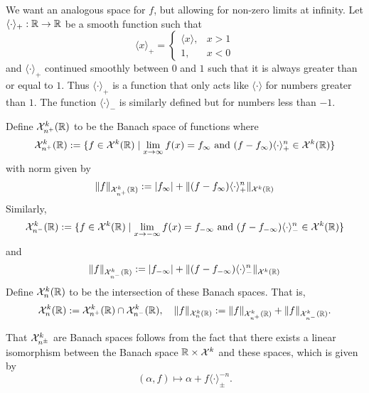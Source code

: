 We want an analogous space for \(f\), but allowing for non-zero limits at infinity. Let \(\langle\cdot \rangle_+ :\mathbb{R} \to \mathbb{R}\) be a smooth function such that
\begin{equation}
	\langle x \rangle_+ = \begin{cases} \langle x \rangle, & x>1 \\ 1, & x<0\end{cases}
\end{equation}
and \(\langle \cdot \rangle_+\) continued smoothly between \(0\) and \(1\) such that it is always greater than or equal to \(1\). Thus \(\langle \cdot \rangle_+\) is a function that only acts like \(\langle \cdot \rangle\) for numbers greater than \(1\). The function \(\langle \cdot \rangle_-\) is similarly defined but for numbers less than \(-1\).

\begin{defn}
	Define \(\mathcal{X}^k_{n^+} (\mathbb{R})\) to be the Banach space of functions where 
	\begin{equation}
		\mathcal{X}^k_{n^+} (\mathbb{R}) := \{ f \in \mathcal{X}^k(\mathbb{R}) \mid \lim_{x\to\infty} f(x) = f_\infty\text{ and } (f-f_\infty)\langle\cdot\rangle_+^n \in \mathcal{X}^k(\mathbb{R})\}
	\end{equation}
	with norm given by
	\begin{equation}
		\| f \|_{\mathcal{X}^k_{n^+}(\mathbb{R})} := |f_\infty| + \|(f-f_\infty) \langle \cdot \rangle_+^n \|_{\mathcal X^k(\mathbb{R})}
	\end{equation}
	Similarly, 
	\begin{equation}
		\mathcal{X}^k_{n^-} (\mathbb{R}) := \{ f \in \mathcal{X}^k(\mathbb{R}) \mid \lim_{x\to-\infty} f(x) = f_{-\infty}\text{ and } (f-f_{-\infty})\langle\cdot\rangle_-^n \in \mathcal{X}^k(\mathbb{R})\}
	\end{equation}
	and 
	\begin{equation}
		\| f \|_{\mathcal{X}^k_{n^-}(\mathbb{R})} := |f_{-\infty}| + \|(f-f_{-\infty}) \langle \cdot \rangle_-^n \|_{\mathcal X^k(\mathbb{R})}
	\end{equation}
	Define \(\mathcal{X}^k_n(\mathbb{R})\) to be the intersection of these Banach spaces. That is,
	\begin{equation}
		\mathcal{X}^k_n(\mathbb{R}) := \mathcal{X}^k_{n^+} (\mathbb{R}) \cap \mathcal{X}^k_{n^-} (\mathbb{R}), \quad \| f \|_{\mathcal{X}^k_{n} (\mathbb{R})} := \|f\|_{\mathcal{X}^k_{n^+} (\mathbb{R})} + \|f\|_{\mathcal{X}^k_{n^-} (\mathbb{R})}.
	\end{equation}
\end{defn}
	That \(\mathcal{X}^k_{n^\pm}\) are Banach spaces follows from the fact that there exists a linear isomorphism between the Banach space \(\mathbb{R}\times \mathcal{X}^k\) and these spaces, which is given by
\begin{equation}
	(\alpha, f) \mapsto \alpha + f \langle \cdot \rangle^{-n}_{\pm}.
\end{equation}


